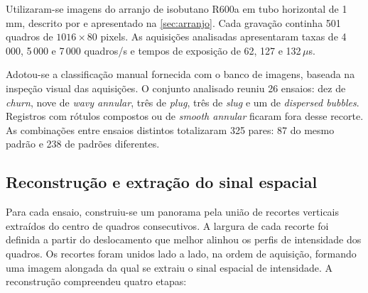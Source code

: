 Utilizaram-se imagens do arranjo de isobutano R600a em tubo horizontal de 1\,mm,
descrito por  e apresentado na \autoref{sec:arranjo}.
Cada gravação continha 501 quadros de $1016\times80$ pixels.
As aquisições analisadas apresentaram taxas de 4\,000, 5\,000 e 7\,000 quadros/s
e tempos de exposição de 62, 127 e 132\,$\mu$s.

Adotou-se a classificação manual fornecida com o banco de imagens, baseada
na inspeção visual das aquisições. O conjunto analisado reuniu 26 ensaios:
dez de \textit{churn}, nove de \textit{wavy annular}, três de \textit{plug}, três de
\textit{slug} e um de \textit{dispersed bubbles}. Registros com rótulos compostos ou de
\textit{smooth annular} ficaram fora desse recorte.
As combinações entre ensaios distintos totalizaram 325 pares: 87 do mesmo
padrão e 238 de padrões diferentes.

\subsection{Reconstrução e extração do sinal espacial}\label{sec:met-extracao}

Para cada ensaio, construiu-se um panorama pela união de recortes verticais
extraídos do centro de quadros consecutivos. A largura de cada recorte foi
definida a partir do deslocamento que melhor alinhou os perfis de intensidade
dos quadros. Os recortes foram unidos lado a lado, na ordem de aquisição,
formando uma imagem alongada da qual se extraiu o sinal espacial de intensidade.
A reconstrução compreendeu quatro etapas:

